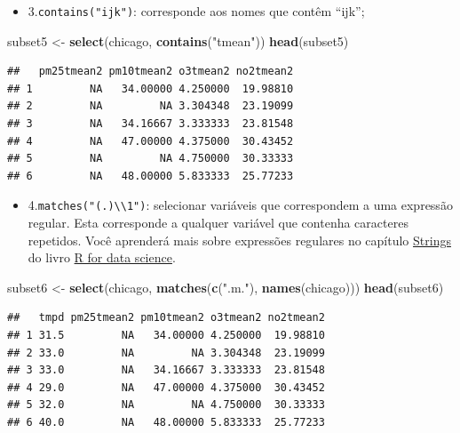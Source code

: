 \documentclass[a4paper]{book}
\newenvironment{Shaded}{\begin{snugshade}}{\end{snugshade}}
\newcommand{\KeywordTok}[1]{\textcolor[rgb]{0.13,0.29,0.53}{\textbf{#1}}}
\newcommand{\NormalTok}[1]{#1}
\newcommand{\StringTok}[1]{\textcolor[rgb]{0.31,0.60,0.02}{#1}}
\providecommand{\tightlist}{%
  \setlength{\itemsep}{0pt}\setlength{\parskip}{0pt}}
\begin{document}
\begin{itemize}
\tightlist
\item
  3.\texttt{contains("ijk")}: corresponde aos nomes que contêm ``ijk'';
\end{itemize}

\begin{Shaded}
\begin{Highlighting}[]
\NormalTok{subset5 <-}\StringTok{ }\KeywordTok{select}\NormalTok{(chicago, }\KeywordTok{contains}\NormalTok{(}\StringTok{"tmean"}\NormalTok{))}
\KeywordTok{head}\NormalTok{(subset5)}
\end{Highlighting}
\end{Shaded}

\begin{verbatim}
##   pm25tmean2 pm10tmean2 o3tmean2 no2tmean2
## 1         NA   34.00000 4.250000  19.98810
## 2         NA         NA 3.304348  23.19099
## 3         NA   34.16667 3.333333  23.81548
## 4         NA   47.00000 4.375000  30.43452
## 5         NA         NA 4.750000  30.33333
## 6         NA   48.00000 5.833333  25.77233
\end{verbatim}

\begin{itemize}
\tightlist
\item
  4.\texttt{matches("(.)\textbackslash{}\textbackslash{}1")}: selecionar variáveis que correspondem a uma expressão regular. Esta corresponde a qualquer variável que contenha caracteres repetidos. Você aprenderá mais sobre expressões regulares no capítulo \href{https://r4ds.had.co.nz/strings.html}{Strings} do livro \href{https://r4ds.had.co.nz/}{R for data science}.
\end{itemize}

\begin{Shaded}
\begin{Highlighting}[]
\NormalTok{subset6 <-}\StringTok{ }\KeywordTok{select}\NormalTok{(chicago, }\KeywordTok{matches}\NormalTok{(}\KeywordTok{c}\NormalTok{(}\StringTok{".m."}\NormalTok{), }\KeywordTok{names}\NormalTok{(chicago)))}
\KeywordTok{head}\NormalTok{(subset6)}
\end{Highlighting}
\end{Shaded}

\begin{verbatim}
##   tmpd pm25tmean2 pm10tmean2 o3tmean2 no2tmean2
## 1 31.5         NA   34.00000 4.250000  19.98810
## 2 33.0         NA         NA 3.304348  23.19099
## 3 33.0         NA   34.16667 3.333333  23.81548
## 4 29.0         NA   47.00000 4.375000  30.43452
## 5 32.0         NA         NA 4.750000  30.33333
## 6 40.0         NA   48.00000 5.833333  25.77233
\end{verbatim}
\end{document}

